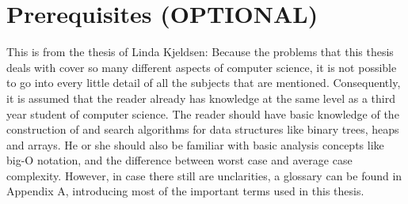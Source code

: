 \chapter*{Prerequisites (OPTIONAL)}
This is from the thesis of Linda Kjeldsen: Because the problems that
this thesis deals with cover so many different aspects of computer
science, it is not possible to go into every little detail of all
the subjects that are mentioned. Consequently, it is assumed that
the reader already has knowledge at the same level as a third year
student of computer science. The reader should have basic knowledge
of the construction of and search algorithms for data structures
like binary trees, heaps and arrays. He or she should also be
familiar with basic analysis concepts like big-O notation, and the
difference between worst case and average case complexity. However,
in case there still are unclarities, a glossary can be found in
Appendix A, introducing most of the important terms used in this
thesis.

\cleardoublepage
